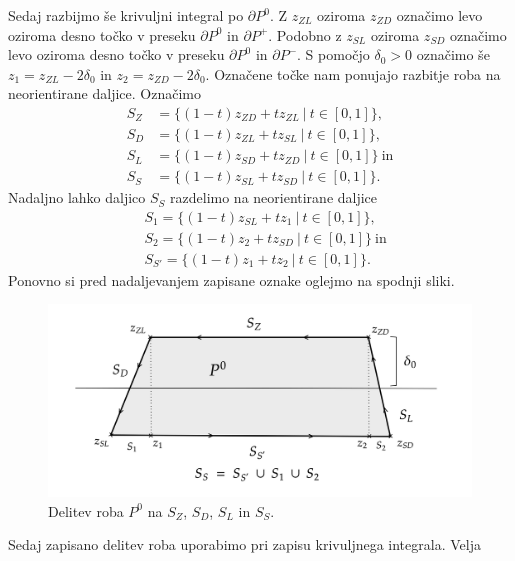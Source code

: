 \documentclass[mat1, tisk]{fmfdelo}
\begin{document}
\begin{dokaz}
        Sedaj razbijmo še krivuljni integral po $\partial P^0$. 
        Z $z_{ZL}$ oziroma $z_{ZD}$ označimo levo oziroma desno točko v preseku $\partial P^0$ in $\partial P^+$. 
        Podobno z $z_{SL}$ oziroma $z_{SD}$ označimo levo oziroma desno točko v preseku $\partial P^0$ in $\partial P^-$.
        S pomočjo $\delta_0 > 0$ označimo še $z_1 = z_{ZL} - 2 \delta_0$ in $z_2 = z_{ZD} - 2 \delta_0$.
        Označene točke nam ponujajo razbitje roba na neorientirane daljice. Označimo 
        \begin{align*}
            S_Z &= \{(1-t)z_{ZD} + t z_{ZL}~|~ t \in [0,1]\}, \\
            S_D &= \{(1-t)z_{ZL} + t z_{SL}~|~ t \in [0,1]\}, \\
            S_L &= \{(1-t)z_{SD} + t z_{ZD}~|~ t \in [0,1]\}~\text{in}\\ 
            S_S &= \{(1-t)z_{SL} + t z_{SD}~|~ t \in [0,1]\}.
        \end{align*}
        Nadaljno lahko daljico $S_S$ razdelimo na neorientirane daljice 
        \begin{align*}
            &S_1 = \{(1-t)z_{SL} + t z_{1}~|~ t \in [0,1]\}, \\
            &S_2 = \{(1-t)z_{2} + t z_{SD}~|~ t \in [0,1]\}~\text{in} \\
            &S_{S'} = \{(1-t)z_{1} + t z_{2}~|~ t \in [0,1]\}.
        \end{align*}
        Ponovno si pred nadaljevanjem zapisane oznake oglejmo na spodnji sliki. 
        \begin{figure}[H]
            \begin{center}
                \includegraphics[width = \textwidth]{schwarz_hol_int.png}
                \caption{Delitev roba $P^0$ na $S_Z$, $S_D$, $S_L$ in $S_S$.}
            \end{center}    
        \end{figure}
        Sedaj zapisano delitev roba uporabimo pri zapisu krivuljnega integrala. Velja

\end{dokaz}
\end{document}
